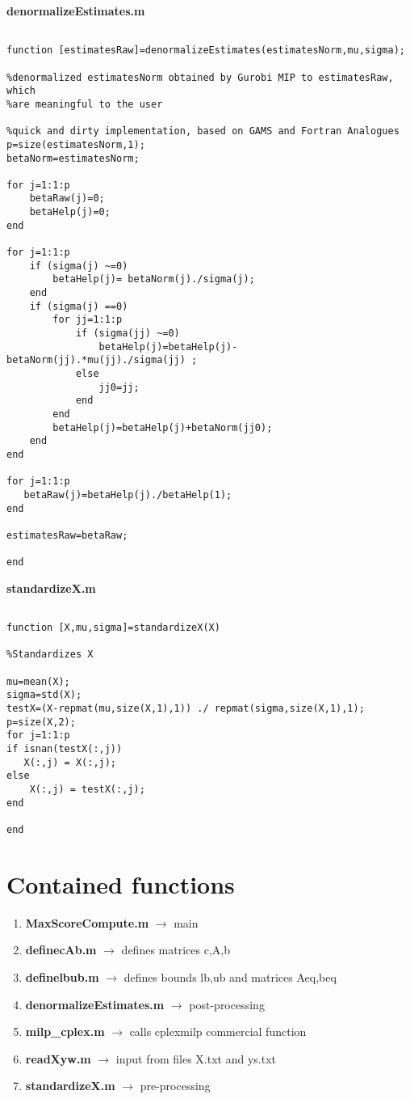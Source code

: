 \documentclass[12pt]{article}
\begin{document}
\textbf{denormalizeEstimates.m}

\begin{lstlisting}

function [estimatesRaw]=denormalizeEstimates(estimatesNorm,mu,sigma);

%denormalized estimatesNorm obtained by Gurobi MIP to estimatesRaw, which
%are meaningful to the user

%quick and dirty implementation, based on GAMS and Fortran Analogues
p=size(estimatesNorm,1);
betaNorm=estimatesNorm;

for j=1:1:p
    betaRaw(j)=0;
    betaHelp(j)=0;
end

for j=1:1:p
    if (sigma(j) ~=0) 
        betaHelp(j)= betaNorm(j)./sigma(j);
    end
    if (sigma(j) ==0)
        for jj=1:1:p
            if (sigma(jj) ~=0)
                betaHelp(j)=betaHelp(j)-betaNorm(jj).*mu(jj)./sigma(jj) ;
            else
                jj0=jj;
            end
        end
        betaHelp(j)=betaHelp(j)+betaNorm(jj0);
    end
end

for j=1:1:p
   betaRaw(j)=betaHelp(j)./betaHelp(1); 
end

estimatesRaw=betaRaw;

end

\end{lstlisting}



\textbf{standardizeX.m}

\begin{lstlisting}

function [X,mu,sigma]=standardizeX(X)

%Standardizes X

mu=mean(X);
sigma=std(X);
testX=(X-repmat(mu,size(X,1),1)) ./ repmat(sigma,size(X,1),1);
p=size(X,2);
for j=1:1:p
if isnan(testX(:,j))
   X(:,j) = X(:,j);
else
    X(:,j) = testX(:,j);
end

end

\end{lstlisting}





\section{Contained functions} \label{Sec:Contents}

\begin{enumerate}
\item \textbf{MaxScoreCompute.m}  $\rightarrow$  main
\item \textbf{definecAb.m}       $\rightarrow$  defines matrices c,A,b
\item \textbf{definelbub.m}      $\rightarrow$ defines bounds lb,ub and matrices Aeq,beq
\item \textbf{denormalizeEstimates.m}  $\rightarrow$ post-processing
\item \textbf{milp\_cplex.m} $\rightarrow$ calls cplexmilp commercial function
\item \textbf{readXyw.m}  $\rightarrow$ input from files X.txt and ys.txt
\item \textbf{standardizeX.m} $\rightarrow$ pre-processing
\end{enumerate}
\end{document}
